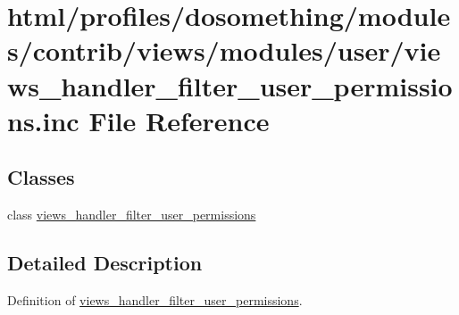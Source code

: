 \hypertarget{views__handler__filter__user__permissions_8inc}{
\section{html/profiles/dosomething/modules/contrib/views/modules/user/views\_\-handler\_\-filter\_\-user\_\-permissions.inc File Reference}
\label{views__handler__filter__user__permissions_8inc}
}
\subsection*{Classes}
\begin{DoxyCompactItemize}
\item 
class \hyperlink{classviews__handler__filter__user__permissions}{views\_\-handler\_\-filter\_\-user\_\-permissions}
\end{DoxyCompactItemize}


\subsection{Detailed Description}
Definition of \hyperlink{classviews__handler__filter__user__permissions}{views\_\-handler\_\-filter\_\-user\_\-permissions}. 